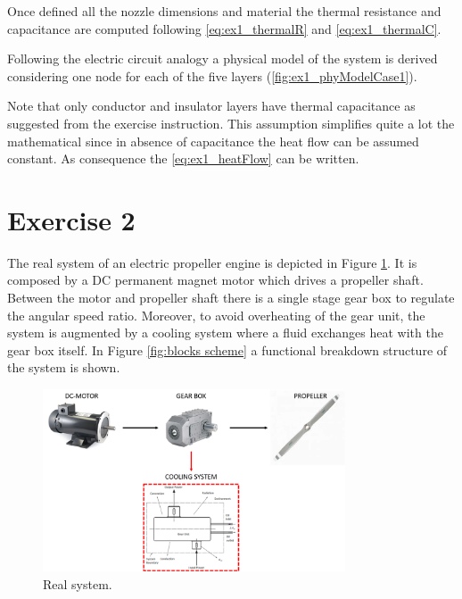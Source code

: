 \documentclass[11pt,a4paper,oneside]{article}
\begin{document}
Once defined all the nozzle dimensions and material the thermal resistance and capacitance are computed following \cref{eq:ex1_thermalR} and \cref{eq:ex1_thermalC}.

Following the electric circuit analogy a physical model of the system is derived considering one node for each of the five layers (\cref{fig:ex1_phyModelCase1}).

Note that only conductor and insulator layers have thermal capacitance as suggested from the exercise instruction.
This assumption simplifies quite a lot the mathematical since in absence of capacitance the heat flow can be assumed constant.
As consequence the \cref{eq:ex1_heatFlow} can be written. 

\clearpage
\section*{Exercise 2}
The real system of an electric propeller engine is depicted in Figure \ref{fig:propeller}.
It is composed by a DC permanent magnet motor which drives a propeller shaft.
Between the motor and propeller shaft there is a single stage gear box to regulate the angular speed ratio.
Moreover, to avoid overheating of the gear unit, the system is augmented by a cooling system where a fluid exchanges heat with the gear box itself.
In Figure \ref{fig:blocks scheme} a functional breakdown structure of the system is shown. 

\begin{figure}[ht!]
    \centering
    \includegraphics[width=0.8\textwidth]{Figures/RealSystem_msas.png}
    \caption{\label{fig:propeller} Real system.}
\end{figure}
\end{document}
